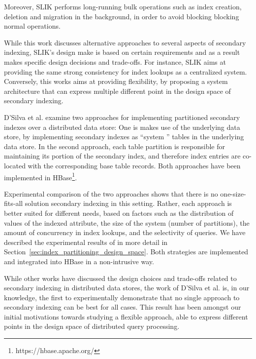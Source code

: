 Moreover, SLIK performs long-running bulk operations such as index creation, deletion and migration in the background,
in order to avoid blocking blocking normal operations.

While this work discusses alternative approaches to several aspects of secondary indexing,
SLIK's design make is based on certain requirements and as a result makes specific design decisions and trade-offs.
For instance, SLIK aims at providing the same strong consistency for index lookups as a centralized system.
Conversely, this works aims at providing flexibility, by proposing a system architecture that can express multiple
different point in the design space of secondary indexing.

\bigskip
\noindent
D'Silva et al. \cite{dsilva:tworings} examine two approaches for implementing partitioned secondary indexes over a
distributed data store:
One is makes use of the underlying data store, by implementing secondary indexes as ``system '' tables in the underlying
data store.
In the second approach, each table partition is responsible for maintaining its portion of the secondary index,
and therefore index entries are co-located with the corresponding base table records.
Both approaches have been implemented in HBase\footnote{https://hbase.apache.org/}.

Experimental comparison of the two approaches shows that there is no one-size-fits-all solution secondary indexing in
this setting.
Rather, each approach is better suited for different needs,
based on factors such as the distribution of values of the indexed attribute,
the size of the system (number of partitions), the amount of concurrency in index lookups,
and the selectivity of queries.
We have described the experimental results of \cite{dsilva:tworings} in more detail in Section~\ref{sec:index_partitioning_design_space}.
Both strategies are implemented and integrated into HBase in a non-intrusive way.

While other works \cite{kejriwal:slik, tan:diffindex} have discussed the design choices and trade-offs related to secondary
indexing in distributed data stores, the work of D'Silva et al. is, in our knowledge, the first to experimentally
demonstrate that no single approach to secondary indexing can be best for all cases.
This result has been amongst our initial motivations towards studying a flexible approach,
able to express different points in the design space of distributed query processing.

